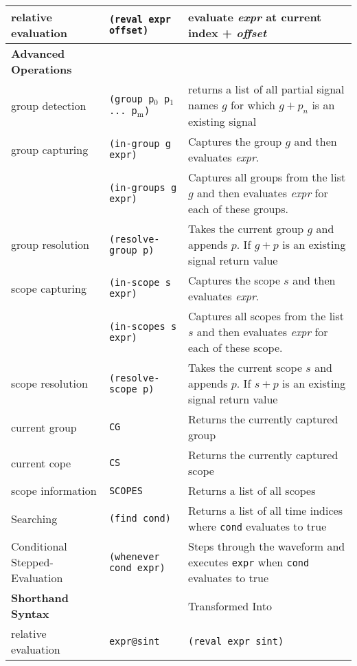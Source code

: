 \documentclass[9pt]{article}
\begin{document}
\begin{table*}[h]
\begin{tabular}{lll}
    \midrule
    relative evaluation     & {\tt(reval expr offset)} & evaluate \emph{expr} at current index + \emph{offset}\\
    \bottomrule
    {\large {\bf Advanced Operations}} & & \\
    \toprule
    group detection         & {\tt (group p$_\text{0}$ p$_\text{1}$ ... p$_\text{m}$)}  & returns a list of all partial signal names $g$ for which $g + p_n$ is an existing signal\\
    group capturing         & {\tt (in-group g expr)} & Captures the group $g$ and then evaluates \emph{expr}.\\
                                        & {\tt (in-groups g expr)} & Captures all groups from the list $g$ and then evaluates \emph{expr} for each of these groups.\\
    group resolution        & {\tt (resolve-group p)} & Takes the current group $g$ and appends $p$. If $g + p$ is an existing signal return value\\
    scope capturing         & {\tt (in-scope s expr)} & Captures the scope $s$ and then evaluates \emph{expr}.\\
                                        & {\tt (in-scopes s expr)} & Captures all scopes from the list $s$ and then evaluates \emph{expr} for each of these scope.\\
    scope resolution        & {\tt (resolve-scope p)} & Takes the current scope $s$ and appends $p$. If $s + p$ is an existing signal return value\\
    current group           & {\tt CG} & Returns the currently captured group \\
    current cope            & {\tt CS} & Returns the currently captured scope \\
    scope information       & {\tt SCOPES} & Returns a list of all scopes \\
    \midrule
    Searching               & {\tt (find cond)} & Returns a list of all time indices where {\tt cond} evaluates to true\\
    Conditional Stepped-Evaluation & {\tt (whenever cond expr)} & Steps through the waveform and executes {\tt expr} when {\tt cond} evaluates to true\\
    \bottomrule
    {\large {\bf Shorthand Syntax}} & & Transformed Into\\
    \toprule
    relative evaluation      & \texttt{expr@sint}                          & \texttt{(reval expr sint)}        \\

\end{tabular}
\end{table*}
\end{document}
